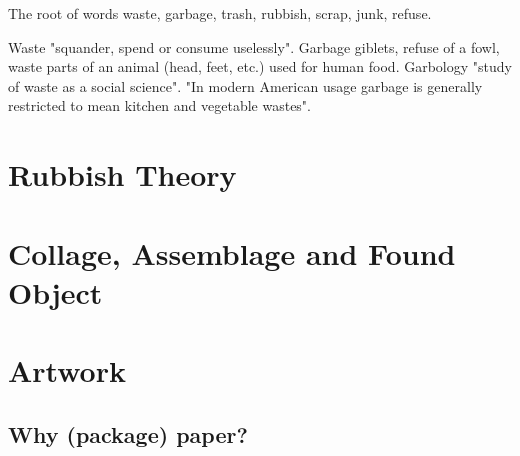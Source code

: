 \documentclass{article}
\begin{document}
The root of words waste, garbage, trash, rubbish, scrap, junk, refuse.

Waste "squander, spend or consume uselessly". Garbage giblets, refuse of a fowl, waste parts of an animal (head, feet, etc.) used for human food. Garbology "study of waste as a social science". "In modern American usage garbage is generally restricted to mean kitchen and vegetable wastes".

\section{Rubbish Theory}

\section{Collage, Assemblage and Found Object}

\section{Artwork}
\subsection{Why (package) paper?}



\end{document}
